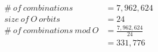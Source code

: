 \documentclass[preview, border=2mm]{standalone}
\begin{document}
\vspace*{\fill}

{\fontsize{32pt}{40pt}\selectfont
	\begin{align*}
		\#\ of\ combinations &= 7{,}962{,}624 \\
		size\ of\ O\ orbits &= 24 \\
		\#\ of\ combinations\ mod\ O &= \frac{7{,}962{,}624}{24} \\
			&= 331{,}776
	\end{align*}
}

\vspace*{\fill}
\end{document}
